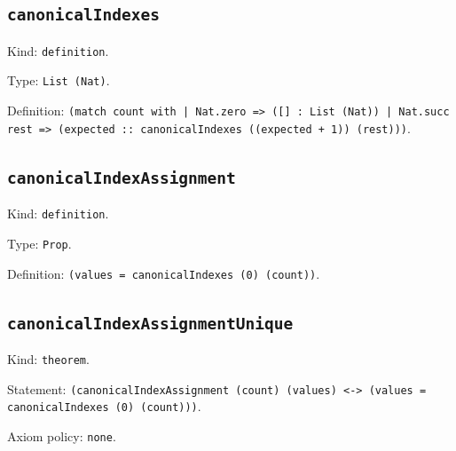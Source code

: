 \documentclass[11pt]{article}
\begin{document}
\subsection*{\texttt{canonicalIndexes}}
\noindent Kind: \texttt{definition}.\par
\noindent Type: \texttt{List (Nat)}.\par
\noindent Definition: \texttt{(match count with | Nat.zero => ([] : List (Nat)) | Nat.succ rest => (expected :: canonicalIndexes ((expected + 1)) (rest)))}.\par
\subsection*{\texttt{canonicalIndexAssignment}}
\noindent Kind: \texttt{definition}.\par
\noindent Type: \texttt{Prop}.\par
\noindent Definition: \texttt{(values = canonicalIndexes (0) (count))}.\par
\subsection*{\texttt{canonicalIndexAssignmentUnique}}
\noindent Kind: \texttt{theorem}.\par
\noindent Statement: \texttt{(canonicalIndexAssignment (count) (values) <-> (values = canonicalIndexes (0) (count)))}.\par
\noindent Axiom policy: \texttt{none}.\par
\end{document}
